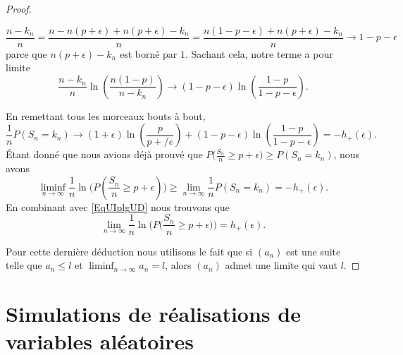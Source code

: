 \begin{proof}
\begin{enumerate}
            \begin{equation}
                \frac{ n-k_n }{ n }=\frac{ n-n(p+\epsilon)+n(p+\epsilon)-k_n }{ n }=\frac{ n(1-p-\epsilon)+n(p+\epsilon)-k_n }{ n }\to 1-p-\epsilon
            \end{equation}
            parce que \( n(p+\epsilon)-k_n\) est borné par \( 1\). Sachant cela, notre terme a pour limite
            \begin{equation}
                \frac{ n-k_n }{ n }\ln\left( \frac{ n(1-p) }{ n-k_n } \right)\to (1-p-\epsilon)\ln\left( \frac{ 1-p }{ 1-p-\epsilon } \right).
            \end{equation}
            
    \end{enumerate}
    En remettant tous les morceaux bouts à bout,
    \begin{equation}
        \frac{1}{ n }P(S_n=k_n)\to (1+\epsilon)\ln\left( \frac{ p }{ p+/e } \right)+(1-p-\epsilon)\ln\left( \frac{ 1-p }{ 1-p-\epsilon } \right)=-h_+(\epsilon).
    \end{equation}
    Étant donné que nous avions déjà prouvé que \( P\big( \frac{ S_n }{ n }\geq p+\epsilon \big)\geq P(S_n=k_n)\), nous avons
    \begin{equation}
        \liminf_{n\to \infty}\frac{1}{ n }\ln\Big( P(\frac{ S_n }{ n }\geq p+\epsilon) \Big)\geq \lim_{n\to \infty} \frac{1}{ n }P(S_n=k_n)=-h_+(\epsilon).
    \end{equation}
    En combinant avec \eqref{EqUIplgUD} nous trouvons que
    \begin{equation}
        \lim_{n\to \infty} \frac{1}{ n }\ln\Big( P\big( \frac{ S_n }{ n }\geq p+\epsilon \big) \Big)=h_+(\epsilon).
    \end{equation}
    
    Pour cette dernière déduction nous utilisons le fait que si \( (a_n)\) est une suite telle que \( a_n\leq l\) et \( \liminf_{n\to\infty}a_n=l\), alors \( (a_n)\) admet une limite qui vaut \( l\).
\end{proof}

\section{Simulations de réalisations de variables aléatoires}

